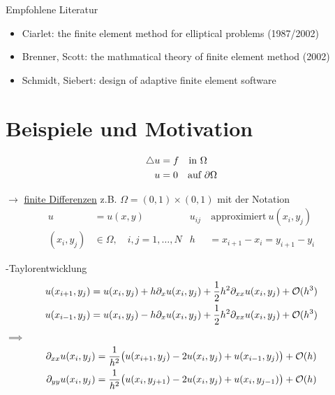 
Empfohlene Literatur
\begin{itemize}
	\item Ciarlet: the finite element method for elliptical problems (1987/2002)\\
	\item Brenner, Scott: the mathmatical theory of finite element method (2002)\\
	\item Schmidt, Siebert: design of adaptive finite element software
\end{itemize}



\section{Beispiele und Motivation}

\begin{align*}

	\laplace u &= f \quad  \text{in }  \Omega\\
		  	 u &= 0 \quad \text{auf } \partial\Omega

\end{align*}

$\rightarrow$ \underline{finite Differenzen}\enter
\enter
z.B. $\Omega = (0,1) \times (0,1)$ mit der Notation
\begin{align*}
	 u&= u(x,y)				 &   u_{ij}&\ \text{approximiert}\ u(x_i,y_j)\\
	(x_i, y_j) &\in \Omega, \quad i,j = 1,\dots,N&  h&= x_{i+1} - x_i = y_{i+1}-y_i
\end{align*}

-Taylorentwicklung
\begin{align*}
	u(x_{i+1},y_j) &= 	u(x_{i},y_j) + 	h\partial_x u(x_{i},y_j) + \frac{1}{2}h^2 \partial_{xx}	u(x_i,y_j) + \mathcal{O}(h^3)\\
	u(x_{i-1},y_j) &= 	u(x_{i},y_j) - 	h\partial_x u(x_{i},y_j) + \frac{1}{2}h^2 \partial_{xx}	u(x_i,y_j) + \mathcal{O}(h^3)\\
\end{align*}

$\implies$
\begin{align*}
	\partial_{xx} u(x_i,y_j) &= \frac{1}{h^2}\big(	u(x_{i+1},y_j) - 2u(x_i,y_j) + 	u(x_{i-1},y_j) \big) + \mathcal{O}(h)\\
	\partial_{yy} u(x_i,y_j) &= \frac{1}{h^2}\big(	u(x_i,y_{j+1}) - 2u(x_i,y_j) + 	u(x_i,y_{j-1}) \big) + \mathcal{O}(h)
\end{align*}

